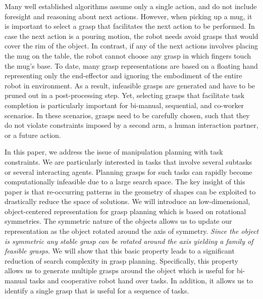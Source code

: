 \documentclass{aamas2015}
\begin{document}
Many well established algorithms assume only a single action, and do not include foresight and
reasoning about next actions. However, when picking up a mug, it is important to select a grasp that
facilitates the next action to be performed. In case the next action is a pouring motion, the robot
needs avoid grasps that would cover the rim of the object. In contrast, if any of the next actions
involves placing the mug on the table, the robot cannot choose any grasp in which fingers touch the
mug's base. To date, many grasp representations are based on a floating hand representing only the
end-effector and ignoring the embodiment of the entire robot in environment. As a result, infeasible
grasps are generated and have to be pruned out in a post-processing step. Yet, selecting grasps that
facilitate task completion is particularly important for bi-manual, sequential, and co-worker
scenarios. In these scenarios, grasps need to be carefully chosen, such that they do not violate
constraints imposed by a second arm, a human interaction partner, or a future action. 

In this paper, we address the issue of manipulation planning with task constraints. We are
particularly interested in tasks that involve several subtasks or several interacting agents.
Planning grasps for such tasks can rapidly become computationally infeasible due to a large search
space. The key insight of this paper is that re-occurring patterns in the geometry of shapes can be
exploited to drastically reduce the space of solutions. We will introduce an low-dimensional,
object-centered representation for grasp planning which is based on rotational symmetries. The
symmetric nature of the objects allows us to update our representation as the object rotated around
the axis of symmetry. \emph{Since the object is symmetric any stable grasp can be rotated around the
axis yielding a family of feasible grasps}. We will show that this basic property leads to a
significant reduction of search complexity in grasp planning. Specifically, this property allows us
to generate multiple grasps around the object which is useful for bi-manual tasks and cooperative
robot hand over tasks. In addition, it allows us to identify a single grasp that is useful for a
sequence of tasks.
\end{document}

